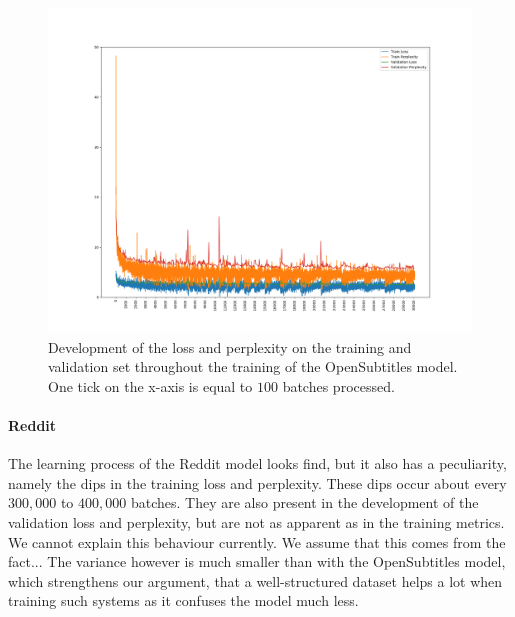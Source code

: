 \begin{figure}[H]
	\includegraphics[width=\linewidth]{img/plots/opensubtitles_not_reversed/train_metrics.png}
	\caption{Development of the loss and perplexity on the training and validation set throughout the training of the OpenSubtitles model. One tick on the x-axis is equal to $100$ batches processed.}
	\label{results:learning_process:metrics:opensubtitles}
\end{figure}

\paragraph{Reddit} The learning process of the Reddit model looks find, but it also has a peculiarity, namely the dips in the training loss and perplexity. These dips occur about every $300,000$ to $400,000$ batches. They are also present in the development of the validation loss and perplexity, but are not as apparent as in the training metrics. We cannot explain this behaviour currently. We assume that this comes from the fact... The variance however is much smaller than with the OpenSubtitles model, which strengthens our argument, that a well-structured dataset helps a lot when training such systems as it confuses the model much less.

